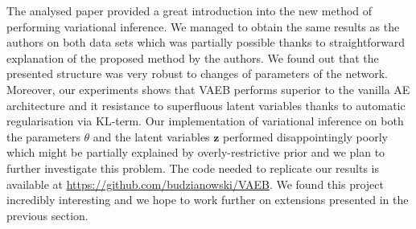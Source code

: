 \documentclass[../report/report.tex]{subfiles}
\begin{document}
The analysed paper provided a great introduction into the new method of performing variational inference. We managed to obtain the same results as the authors on both data sets which was partially possible thanks to straightforward explanation of the proposed method by the authors. We found out that the presented structure was very robust to changes of parameters of the network. Moreover, our experiments shows that VAEB performs superior to the vanilla AE architecture and it resistance to superfluous latent variables thanks to automatic regularisation via KL-term. Our implementation of variational inference on both the parameters $\theta$ and the latent variables $\mathbf{z}$ performed disappointingly poorly which might be partially explained by overly-restrictive prior and we plan to further investigate this problem. The code needed to replicate our results is available at \url{https://github.com/budzianowski/VAEB}. We found this project incredibly interesting and we hope to work further on extensions presented in the previous section.
\end{document}
